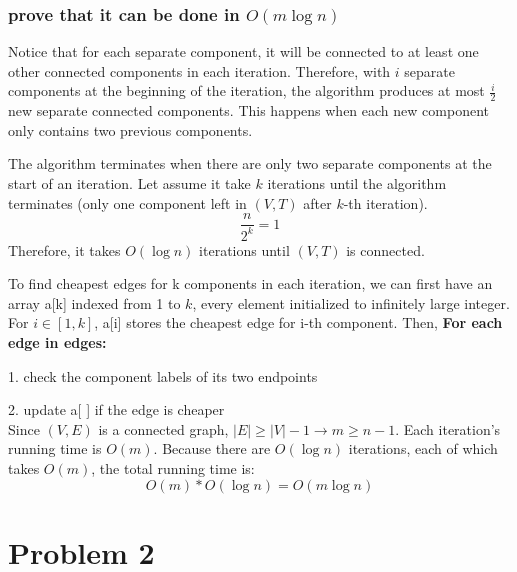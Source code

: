 \documentclass{article}
\begin{document}
\subsubsection{prove that it can be done in $O(m\log{n})$}
Notice that for each separate component, it will be connected to at least one other connected components in each iteration. Therefore, with $i$ separate components at the beginning of the iteration, the algorithm produces at most $\frac{i}{2}$ new separate connected components. This happens when each new component only contains two previous components. 

The algorithm terminates when there are only two separate components at the start of an iteration. Let assume it take $k$ iterations until the algorithm terminates (only one component left in $(V,T)$ after $k$-th iteration).
\[\frac{n}{2^k}=1\]
Therefore, it takes $O(\log{n})$ iterations until $(V,T)$ is connected.

 To find cheapest edges for k components in each iteration, we can first have an array a[k] indexed from 1 to $k$, every element initialized to infinitely large integer. For $i\in[1,k]$, a[i] stores the cheapest edge for i-th component. Then, \textbf{For each edge in edges:}

1. check the component labels of its two endpoints

2. update a[ ] if the edge is cheaper\\
Since $(V,E)$ is a connected graph, $|E|\geq|V|-1 \rightarrow m\geq n-1$. Each iteration's running time is $O(m)$. Because there are $O(\log{n})$ iterations, each of which takes $O(m)$, the total running time is:
\[O(m)*O(\log{n})=O(m\log{n})\]


\section{Problem 2}
\end{document}
